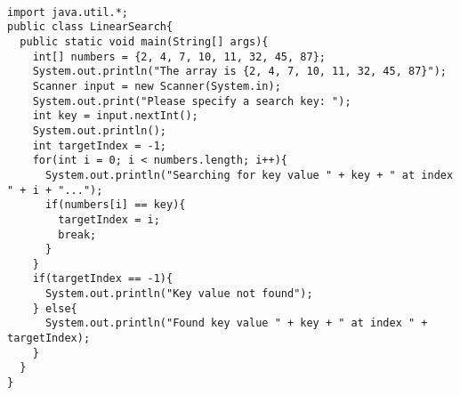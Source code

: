 \documentclass[10pt]{mypackage}
\begin{document}
  \begin{lstlisting}[style=javastyle,title=Writing a Linear Search]
  
import java.util.*;
public class LinearSearch{
  public static void main(String[] args){
    int[] numbers = {2, 4, 7, 10, 11, 32, 45, 87};
    System.out.println("The array is {2, 4, 7, 10, 11, 32, 45, 87}");
    Scanner input = new Scanner(System.in);
    System.out.print("Please specify a search key: ");
    int key = input.nextInt();
    System.out.println();
    int targetIndex = -1;
    for(int i = 0; i < numbers.length; i++){
      System.out.println("Searching for key value " + key + " at index " + i + "...");
      if(numbers[i] == key){
        targetIndex = i;
        break;
      }
    }
    if(targetIndex == -1){
      System.out.println("Key value not found");
    } else{
      System.out.println("Found key value " + key + " at index " + targetIndex);
    }
  }
}
  \end{lstlisting}
  
\end{document}
